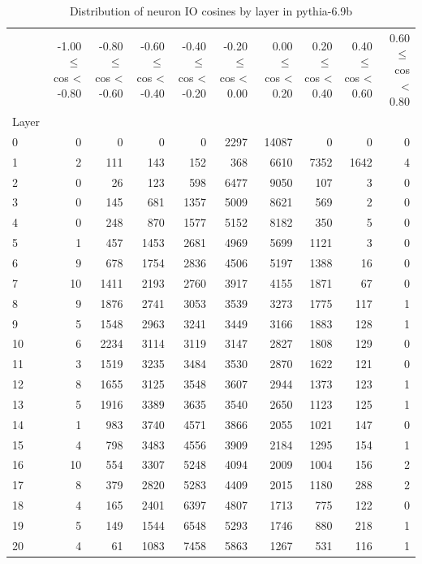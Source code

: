 \begin{table}
\caption{Distribution of neuron IO cosines by layer in pythia-6.9b}
\label{tab:pythia-6.9b_half_coarse}
\begin{tabular}{lrrrrrrrrr}
 & -1.00 $\leq$ cos < -0.80 & -0.80 $\leq$ cos < -0.60 & -0.60 $\leq$ cos < -0.40 & -0.40 $\leq$ cos < -0.20 & -0.20 $\leq$ cos < 0.00 & 0.00 $\leq$ cos < 0.20 & 0.20 $\leq$ cos < 0.40 & 0.40 $\leq$ cos < 0.60 & 0.60 $\leq$ cos < 0.80 \\
Layer &  &  &  &  &  &  &  &  &  \\
0 & 0 & 0 & 0 & 0 & 2297 & 14087 & 0 & 0 & 0 \\
1 & 2 & 111 & 143 & 152 & 368 & 6610 & 7352 & 1642 & 4 \\
2 & 0 & 26 & 123 & 598 & 6477 & 9050 & 107 & 3 & 0 \\
3 & 0 & 145 & 681 & 1357 & 5009 & 8621 & 569 & 2 & 0 \\
4 & 0 & 248 & 870 & 1577 & 5152 & 8182 & 350 & 5 & 0 \\
5 & 1 & 457 & 1453 & 2681 & 4969 & 5699 & 1121 & 3 & 0 \\
6 & 9 & 678 & 1754 & 2836 & 4506 & 5197 & 1388 & 16 & 0 \\
7 & 10 & 1411 & 2193 & 2760 & 3917 & 4155 & 1871 & 67 & 0 \\
8 & 9 & 1876 & 2741 & 3053 & 3539 & 3273 & 1775 & 117 & 1 \\
9 & 5 & 1548 & 2963 & 3241 & 3449 & 3166 & 1883 & 128 & 1 \\
10 & 6 & 2234 & 3114 & 3119 & 3147 & 2827 & 1808 & 129 & 0 \\
11 & 3 & 1519 & 3235 & 3484 & 3530 & 2870 & 1622 & 121 & 0 \\
12 & 8 & 1655 & 3125 & 3548 & 3607 & 2944 & 1373 & 123 & 1 \\
13 & 5 & 1916 & 3389 & 3635 & 3540 & 2650 & 1123 & 125 & 1 \\
14 & 1 & 983 & 3740 & 4571 & 3866 & 2055 & 1021 & 147 & 0 \\
15 & 4 & 798 & 3483 & 4556 & 3909 & 2184 & 1295 & 154 & 1 \\
16 & 10 & 554 & 3307 & 5248 & 4094 & 2009 & 1004 & 156 & 2 \\
17 & 8 & 379 & 2820 & 5283 & 4409 & 2015 & 1180 & 288 & 2 \\
18 & 4 & 165 & 2401 & 6397 & 4807 & 1713 & 775 & 122 & 0 \\
19 & 5 & 149 & 1544 & 6548 & 5293 & 1746 & 880 & 218 & 1 \\
20 & 4 & 61 & 1083 & 7458 & 5863 & 1267 & 531 & 116 & 1 \\

\end{tabular}
\end{table}
